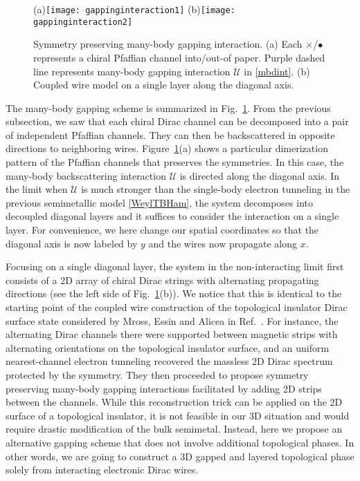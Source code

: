 \begin{figure}[htbp]
	\centering
	(a)\texttt{[image: gappinginteraction1]}
	(b)\texttt{[image: gappinginteraction2]}
	\caption[Symmetry preserving many-body gapping interaction.]{Symmetry preserving many-body gapping interaction. (a) Each {\color{red}$\boldsymbol\times$}/{\color{green}$\bullet$} represents a chiral Pfaffian channel into/out-of paper. Purple dashed line represents many-body gapping interaction $\mathcal{U}$ in \eqref{mbdint}. (b) Coupled wire model on a single layer along the diagonal axis.}\label{fig:gappinginteraction}
\end{figure}

The many-body gapping scheme is summarized in Fig.~\ref{fig:gappinginteraction}. From the previous subsection, we saw that each chiral Dirac channel can be decomposed into a pair of independent Pfaffian channels. They can then be backscattered in opposite directions to neighboring wires. Figure~\ref{fig:gappinginteraction}(a) shows a particular dimerization pattern of the Pfaffian channels that preserves the symmetries. In this case, the many-body backscattering interaction $\mathcal{U}$ is directed along the diagonal axis. In the limit when $\mathcal{U}$ is much stronger than the single-body electron tunneling in the previous semimetallic model \eqref{WeylTBHam}, the system decomposes into decoupled diagonal layers and it suffices to consider the interaction on a single layer. For convenience, we here change our spatial coordinates so that the diagonal axis is now labeled by $y$ and the wires now propagate along $x$.

Focusing on a single diagonal layer, the system in the non-interacting limit first consists of a 2D array of chiral Dirac strings with alternating propagating directions (see the left side of Fig.~\ref{fig:gappinginteraction}(b)). We notice that this is identical to the starting point of the coupled wire construction of the topological insulator Dirac surface state considered by Mross, Essin and Alicea in Ref.~\cite{MrossEssinAlicea15}. For instance, the alternating Dirac channels there were supported between magnetic strips with alternating orientations on the topological insulator surface, and an uniform nearest-channel electron tunneling recovered the massless 2D Dirac spectrum protected by the \AFTR symmetry. They then proceeded to propose symmetry preserving many-body gapping interactions facilitated by adding 2D \FQH strips between the channels. While this reconstruction trick can be applied on the 2D surface of a topological insulator, it is not feasible in our 3D situation and would require drastic modification of the bulk semimetal. Instead, here we propose an alternative gapping scheme that does not involve additional topological phases. In other words, we are going to construct a 3D gapped and layered topological phase solely from interacting electronic Dirac wires.

